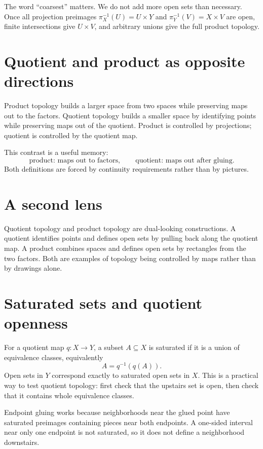 The word “coarsest” matters.  We do not add more open sets than necessary.  Once all projection preimages \(\pi_X^{-1}(U)=U\times Y\) and \(\pi_Y^{-1}(V)=X\times V\) are open, finite intersections give \(U\times V\), and arbitrary unions give the full product topology.

\section{Quotient and product as opposite directions}

Product topology builds a larger space from two spaces while preserving maps out to the factors.  Quotient topology builds a smaller space by identifying points while preserving maps out of the quotient.  Product is controlled by projections; quotient is controlled by the quotient map.

This contrast is a useful memory:
\[
  \text{product: maps out to factors},\qquad
  \text{quotient: maps out after gluing}.
\]
Both definitions are forced by continuity requirements rather than by pictures.

\section{A second lens}

Quotient topology and product topology are dual-looking constructions.  A quotient identifies points and defines open sets by pulling back along the quotient map.  A product combines spaces and defines open sets by rectangles from the two factors.  Both are examples of topology being controlled by maps rather than by drawings alone.

\section{Saturated sets and quotient openness}

For a quotient map \(q:X\to Y\), a subset \(A\subseteq X\) is saturated if it is a union of equivalence classes, equivalently
\[
  A=q^{-1}(q(A)).
\]
Open sets in \(Y\) correspond exactly to saturated open sets in \(X\).  This is a practical way to test quotient topology: first check that the upstairs set is open, then check that it contains whole equivalence classes.

Endpoint gluing works because neighborhoods near the glued point have saturated preimages containing pieces near both endpoints.  A one-sided interval near only one endpoint is not saturated, so it does not define a neighborhood downstairs.

